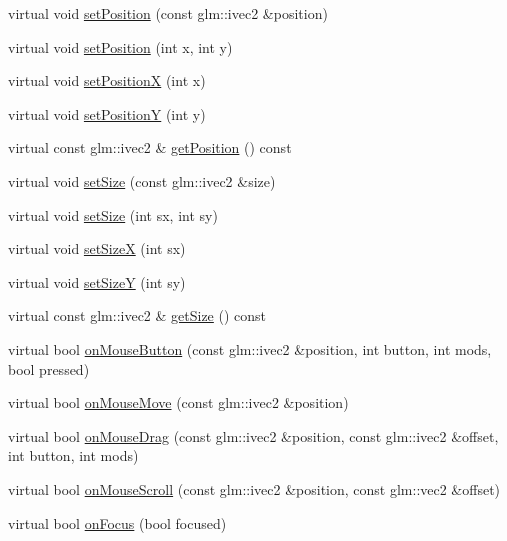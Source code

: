 \begin{DoxyCompactItemize}
virtual void \mbox{\hyperlink{classec__gui_1_1_widget_a8fda49fa882431ec61c1814daeaf1e87}{set\+Position}} (const glm\+::ivec2 \&position)
\item 
virtual void \mbox{\hyperlink{classec__gui_1_1_widget_a8ab5faca86b8bd15791c3f7e9ddd670d}{set\+Position}} (int x, int y)
\item 
virtual void \mbox{\hyperlink{classec__gui_1_1_widget_a0e5b51da257f4416a8a69c37484078f6}{set\+PositionX}} (int x)
\item 
virtual void \mbox{\hyperlink{classec__gui_1_1_widget_a5e2decba654f32f3edf29177ccc187e6}{set\+PositionY}} (int y)
\item 
virtual const glm\+::ivec2 \& \mbox{\hyperlink{classec__gui_1_1_widget_affc97e163aa2e67731870f9733e43120}{get\+Position}} () const
\item 
virtual void \mbox{\hyperlink{classec__gui_1_1_widget_a12407f19d6a4136ff6e4f8437028b488}{set\+Size}} (const glm\+::ivec2 \&size)
\item 
virtual void \mbox{\hyperlink{classec__gui_1_1_widget_a6f268d03e50a94d17775d63e138832fc}{set\+Size}} (int sx, int sy)
\item 
virtual void \mbox{\hyperlink{classec__gui_1_1_widget_a9a96f12e802c704987504e8968dc0f98}{set\+SizeX}} (int sx)
\item 
virtual void \mbox{\hyperlink{classec__gui_1_1_widget_ac5fd00411379914412ecd84160e1ed12}{set\+SizeY}} (int sy)
\item 
virtual const glm\+::ivec2 \& \mbox{\hyperlink{classec__gui_1_1_widget_a0c1754c890435d5eb45ad8725c105714}{get\+Size}} () const
\item 
virtual bool \mbox{\hyperlink{classec__gui_1_1_widget_a824efc45fa4df40d7e1e94f08e6363cf}{on\+Mouse\+Button}} (const glm\+::ivec2 \&position, int button, int mods, bool pressed)
\item 
virtual bool \mbox{\hyperlink{classec__gui_1_1_widget_a22a477e900743ebc57db7703609d7bcc}{on\+Mouse\+Move}} (const glm\+::ivec2 \&position)
\item 
virtual bool \mbox{\hyperlink{classec__gui_1_1_widget_aacc1a265d66b1127f8f4ae968f43ae25}{on\+Mouse\+Drag}} (const glm\+::ivec2 \&position, const glm\+::ivec2 \&offset, int button, int mods)
\item 
virtual bool \mbox{\hyperlink{classec__gui_1_1_widget_a895600dcaf4c40a39828ac01791e199e}{on\+Mouse\+Scroll}} (const glm\+::ivec2 \&position, const glm\+::vec2 \&offset)
\item 
virtual bool \mbox{\hyperlink{classec__gui_1_1_widget_a191230613536809bda9c930d3a2ced7c}{on\+Focus}} (bool focused)

\end{DoxyCompactItemize}
